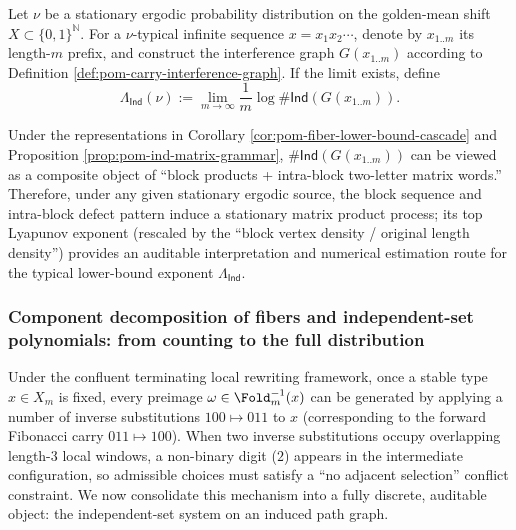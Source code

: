 
\begin{definition}\label{def:pom-ind-lyapunov-fingerprint}
Let $\nu$ be a stationary ergodic probability distribution on the golden-mean shift $X\subset\{0,1\}^{\mathbb N}$.
For a $\nu$-typical infinite sequence $x=x_1x_2\cdots$, denote by $x_{1..m}$ its length-$m$ prefix, and construct the interference graph $G(x_{1..m})$ according to Definition \ref{def:pom-carry-interference-graph}.
If the limit exists, define
\[
\Lambda_{\mathsf{Ind}}(\nu):=\lim_{m\to\infty}\frac{1}{m}\log \#\mathsf{Ind}(G(x_{1..m})).
\]
\end{definition}

\begin{remark}\label{rem:pom-ind-random-matrix}
Under the representations in Corollary \ref{cor:pom-fiber-lower-bound-cascade} and Proposition \ref{prop:pom-ind-matrix-grammar}, $\#\mathsf{Ind}(G(x_{1..m}))$ can be viewed as a composite object of ``block products + intra-block two-letter matrix words.''
Therefore, under any given stationary ergodic source, the block sequence and intra-block defect pattern induce a stationary matrix product process; its top Lyapunov exponent (rescaled by the ``block vertex density / original length density'') provides an auditable interpretation and numerical estimation route for the typical lower-bound exponent $\Lambda_{\mathsf{Ind}}$.
\end{remark}

\subsubsection{Component decomposition of fibers and independent-set polynomials: from counting to the full distribution}\label{subsec:pom-fiber-indset}
Under the confluent terminating local rewriting framework, once a stable type \(x\in X_m\) is fixed, every preimage \(\omega\in\Fold_m^{-1}(x)\) can be generated by applying a number of inverse substitutions \(100\mapsto 011\) to \(x\) (corresponding to the forward Fibonacci carry \(011\mapsto 100\)).
When two inverse substitutions occupy overlapping length-\(3\) local windows, a non-binary digit (\(2\)) appears in the intermediate configuration, so admissible choices must satisfy a ``no adjacent selection'' conflict constraint.
We now consolidate this mechanism into a fully discrete, auditable object: the independent-set system on an induced path graph.


